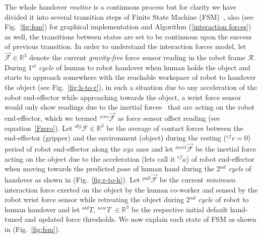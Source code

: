 The whole handover \textit{routine} is a continuous process but for clarity we have divided it into several transition steps of Finite State Machine (FSM)~\cite{johnson1968automatic}, also (see Fig.~\ref{fig:fsm}) for graphical implementation and Algorithm (\ref{interaction forces}) as well, the transitions between states are set to be continuous upon the success of previous transition. In order to understand the interaction forces model, let $\mathcal{\vec{F}}\in \mathbb{R}^3$ denote the current \textit{gravity-free} force sensor reading in the robot frame $\mathcal{R}$. During 1$^{st}$ \textit{cycle} of human to robot handover when human holds the object and starts to approach somewhere with the reachable workspace of robot to handover the object (see Fig.~\ref{fig:h-to-r}), in such a situation due to any acceleration of the robot end-effector while approaching towards the object, a wrist force sensor would only show readings due to the inertial forces~\cite{spong2008robot} that are acting on the robot end-effector, which we termed ${}^{zero}\vec{\mathcal{F}}$ as force sensor offset reading (see equation~\ref{Fzero}). Let ${}^{obj}\overline{\mathcal{F}}\in \mathbb{R}^3$ be the average of contact forces between the end-effector (gripper) and the environment (object) during the resting (${}^{ef}v=0$) period of robot end-effector along the $xyz$ axes and let ${}^{inert}\vec{\mathcal{F}}$ be the inertial force acting on the object due to the acceleration (lets call it ${}^{ef}a$) of robot end-effector when moving towards the predicted pose of human hand during the 2$^{nd}$ \textit{cycle} of handover as shown in (Fig.~\ref{fig:r-to-h}). Let ${}^{pull}\vec{\mathcal{F}}$ be the current \textit{minimum} interaction force exerted on the object by the human co-worker and sensed by the robot wrist force sensor while retreating the object during 2$^{nd}$ \textit{cycle} of robot to human handover and let ${}^{old}T$, ${}^{new}T$ $\in \mathbb{R}^3$ be the respective initial default hand-tuned and updated force thresholds. We now explain each state of FSM as shown in (Fig.~\ref{fig:fsm}).



